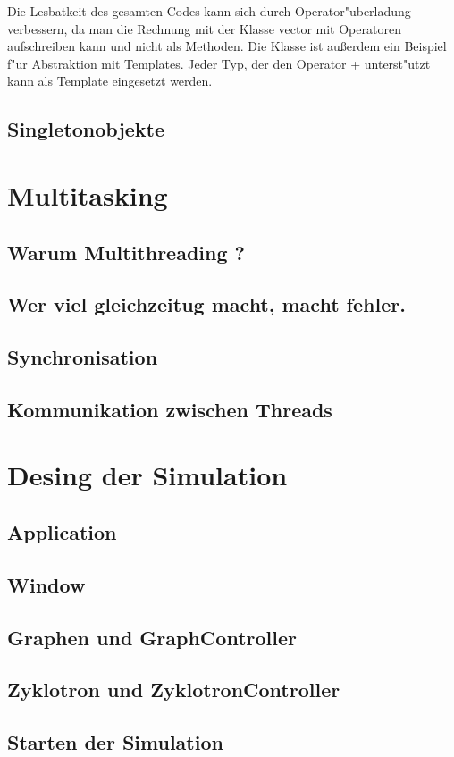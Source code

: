 \documentclass[14pt, a4paper]{report}
\begin{document}
Die Lesbatkeit des gesamten Codes kann sich durch Operator"uberladung verbessern, da man
die Rechnung mit der Klasse vector mit Operatoren aufschreiben kann und nicht als 
Methoden. Die Klasse ist außerdem ein Beispiel f"ur Abstraktion mit Templates. Jeder
Typ, der den Operator + unterst"utzt kann als Template eingesetzt werden.

\section{Singletonobjekte}

\chapter{Multitasking}
\section{Warum Multithreading ?}
\section{Wer viel gleichzeitug macht, macht fehler.}
\section{Synchronisation} \label{Synchronisation}
\section{Kommunikation zwischen Threads}

\chapter{Desing der Simulation}
\section{Application}
\section{Window} 
\section{Graphen und GraphController}
\section{Zyklotron und ZyklotronController}
\section{Starten der Simulation}
\end{document}
